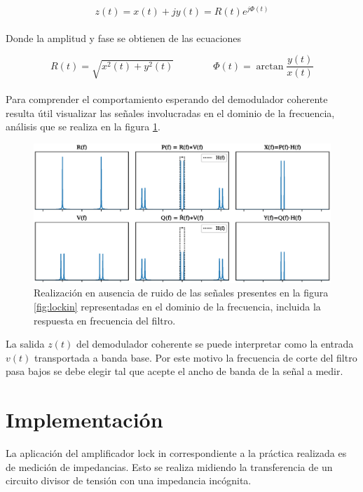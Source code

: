 \documentclass[11pt,a4paper]{extarticle}
\begin{document}
\begin{multicols}{2}
\begin{equation*}
	z(t) = x(t) + j y(t) = R(t) e ^{j\Phi(t)}
\end{equation*}\\[-1em]

Donde la amplitud y fase se obtienen de las ecuaciones

\begin{equation*}
	R(t) = \sqrt{x^2(t)+y^2(t)} \qquad \qquad \Phi(t) = \arctan\frac{y(t)}{x(t)}
\end{equation*}\\


Para comprender el comportamiento esperando del demodulador coherente resulta útil visualizar las señales involucradas en el dominio de la frecuencia, análisis que se realiza en la figura \ref{fig:sigs_fourier}.

\begin{figure}[H]
	\centering
	\includegraphics[width=\linewidth]{Images/sigs_fourier.eps}
	\caption{Realización en ausencia de ruido de las señales presentes en la figura \ref{fig:lockin} representadas en el dominio de la frecuencia, incluida la respuesta en frecuencia del filtro.}
	\label{fig:sigs_fourier}
\end{figure}

La salida $z(t)$ del demodulador coherente se puede interpretar como la entrada $v(t)$ transportada a banda base. Por este motivo la frecuencia de corte del filtro pasa bajos se debe elegir tal que acepte el ancho de banda de la señal a medir.

\section{Implementación}

La aplicación del amplificador lock in correspondiente a la práctica realizada es de medición de impedancias. Esto se realiza midiendo la transferencia de un circuito divisor de tensión con una impedancia incógnita.


\end{multicols}
\end{document}
